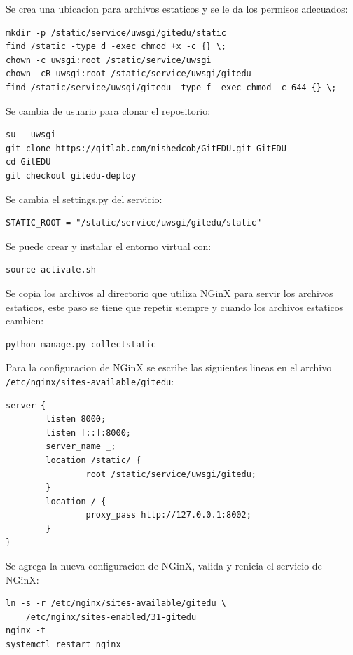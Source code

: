 Se crea una ubicacion para archivos estaticos y se le da los permisos adecuados:
\begin{lstlisting}[breaklines=true]
mkdir -p /static/service/uwsgi/gitedu/static
find /static -type d -exec chmod +x -c {} \;
chown -c uwsgi:root /static/service/uwsgi
chown -cR uwsgi:root /static/service/uwsgi/gitedu
find /static/service/uwsgi/gitedu -type f -exec chmod -c 644 {} \;
\end{lstlisting}

Se cambia de usuario para clonar el repositorio:
\begin{lstlisting}
su - uwsgi
git clone https://gitlab.com/nishedcob/GitEDU.git GitEDU
cd GitEDU
git checkout gitedu-deploy
\end{lstlisting}

Se cambia el settings.py del servicio:
\lstset{language=Python}
\begin{lstlisting}
STATIC_ROOT = "/static/service/uwsgi/gitedu/static"
\end{lstlisting}
\lstset{language=Bash}

Se puede crear y instalar el entorno virtual con:
\begin{lstlisting}
source activate.sh
\end{lstlisting}

Se copia los archivos al directorio que utiliza NGinX para servir los archivos estaticos, este paso se tiene que repetir siempre y cuando los archivos estaticos cambien:
\begin{lstlisting}
python manage.py collectstatic
\end{lstlisting}

Para la configuracion de NGinX se escribe las siguientes lineas en el archivo \\
\texttt{/etc/nginx/sites-available/gitedu}:
\begin{lstlisting}
server {
        listen 8000;
        listen [::]:8000;
        server_name _;
        location /static/ {
                root /static/service/uwsgi/gitedu;
        }
        location / {
                proxy_pass http://127.0.0.1:8002;
        }
}
\end{lstlisting}

Se agrega la nueva configuracion de NGinX, valida y renicia el servicio de NGinX:
\begin{lstlisting}
ln -s -r /etc/nginx/sites-available/gitedu \ 
    /etc/nginx/sites-enabled/31-gitedu
nginx -t
systemctl restart nginx
\end{lstlisting}

